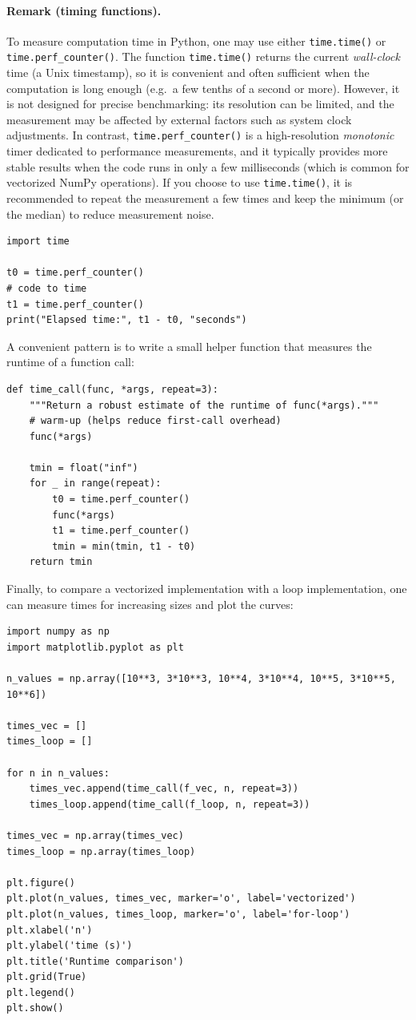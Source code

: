 \documentclass[11pt]{article}
\begin{document}
\paragraph{Remark (timing functions).}
To measure computation time in Python, one may use either \texttt{time.time()} or \texttt{time.perf\_counter()}.
The function \texttt{time.time()} returns the current \emph{wall-clock} time (a Unix timestamp), so it is convenient and often sufficient when the computation is long enough (e.g.\ a few tenths of a second or more).
However, it is not designed for precise benchmarking: its resolution can be limited, and the measurement may be affected by external factors such as system clock adjustments.
In contrast, \texttt{time.perf\_counter()} is a high-resolution \emph{monotonic} timer dedicated to performance measurements, and it typically provides more stable results when the code runs in only a few milliseconds (which is common for vectorized NumPy operations).
If you choose to use \texttt{time.time()}, it is recommended to repeat the measurement a few times and keep the minimum (or the median) to reduce measurement noise.

\begin{lstlisting}
import time

t0 = time.perf_counter()
# code to time
t1 = time.perf_counter()
print("Elapsed time:", t1 - t0, "seconds")
\end{lstlisting}

\medskip
A convenient pattern is to write a small helper function that measures the runtime of a function call:

\begin{lstlisting}
def time_call(func, *args, repeat=3):
    """Return a robust estimate of the runtime of func(*args)."""
    # warm-up (helps reduce first-call overhead)
    func(*args)

    tmin = float("inf")
    for _ in range(repeat):
        t0 = time.perf_counter()
        func(*args)
        t1 = time.perf_counter()
        tmin = min(tmin, t1 - t0)
    return tmin
\end{lstlisting}

\medskip
Finally, to compare a vectorized implementation with a loop implementation, one can measure times for increasing sizes and plot the curves:

\begin{lstlisting}
import numpy as np
import matplotlib.pyplot as plt

n_values = np.array([10**3, 3*10**3, 10**4, 3*10**4, 10**5, 3*10**5, 10**6])

times_vec = []
times_loop = []

for n in n_values:
    times_vec.append(time_call(f_vec, n, repeat=3))
    times_loop.append(time_call(f_loop, n, repeat=3))

times_vec = np.array(times_vec)
times_loop = np.array(times_loop)

plt.figure()
plt.plot(n_values, times_vec, marker='o', label='vectorized')
plt.plot(n_values, times_loop, marker='o', label='for-loop')
plt.xlabel('n')
plt.ylabel('time (s)')
plt.title('Runtime comparison')
plt.grid(True)
plt.legend()
plt.show()
\end{lstlisting}
\end{document}
